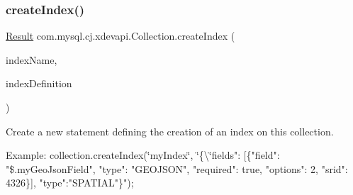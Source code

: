 \subsubsection{\texorpdfstring{create\+Index()}{createIndex()}\hspace{0.1cm}{\footnotesize\ttfamily [1/2]}}
{\footnotesize\ttfamily \mbox{\hyperlink{interfacecom_1_1mysql_1_1cj_1_1xdevapi_1_1_result}{Result}} com.\+mysql.\+cj.\+xdevapi.\+Collection.\+create\+Index (\begin{DoxyParamCaption}\item[{String}]{index\+Name,  }\item[{\mbox{\hyperlink{interfacecom_1_1mysql_1_1cj_1_1xdevapi_1_1_db_doc}{Db\+Doc}}}]{index\+Definition }\end{DoxyParamCaption})}

Create a new statement defining the creation of an index on this collection. 

Example\+: collection.\+create\+Index(\char`\"{}my\+Index\char`\"{}, \char`\"{}\{\textbackslash{}\char`\"{}fields"\+: \mbox{[}\{"field"\+: "\$.my\+Geo\+Json\+Field", "type"\+: "G\+E\+O\+J\+S\+ON", "required"\+: true, "options"\+: 2, "srid"\+: 4326\}\mbox{]}, "type"\+:"S\+P\+A\+T\+I\+AL"\}");


